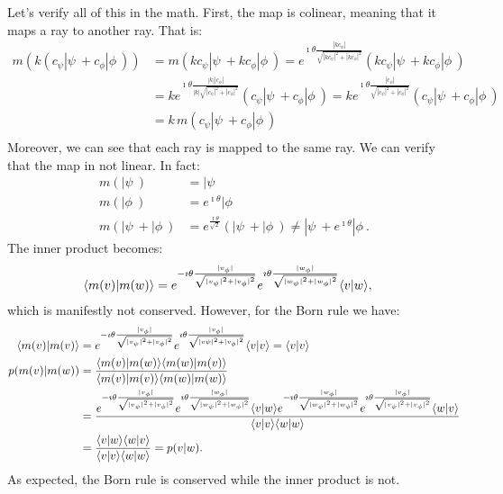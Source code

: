 Let's verify all of this in the math. First, the map is colinear, meaning that it maps a ray to another ray. That is:
\begin{equation}
	\begin{aligned}
	m(k(c_{\psi} | \psi \> + c_{\phi} | \phi \>)) &= m(kc_{\psi} | \psi \> + k c_{\phi} | \phi \>) = e^{\imath \theta \frac{|kc_{\phi}|}{\sqrt{|kc_{\psi}|^2+|kc_{\phi}|^2}}} ( k c_{\psi} | \psi \> + k c_{\phi}  | \phi \>) \\
	&= k e^{\imath \theta \frac{|k||c_{\phi}|}{|k|\sqrt{|c_{\psi}|^2+|c_{\phi}|^2}}} ( c_{\psi} | \psi \> + c_{\phi}  | \phi \>) = k e^{\imath \theta \frac{|c_{\phi}|}{\sqrt{|c_{\psi}|^2+|c_{\phi}|^2}}} \left( c_{\psi} | \psi \> + c_{\phi}  | \phi \> \right) \\
	&= k \, m(c_{\psi} | \psi \> + c_{\phi} | \phi \>) \\
	\end{aligned}
\end{equation}
Moreover, we can see that each ray is mapped to the same ray. We can verify that the map in not linear. In fact:
\begin{equation}
	\begin{aligned}
		m(|\psi\>) &= |\psi\> \\
		m(|\phi\>) &=  e^{\imath \theta} | \phi \>\\
		m(|\psi\> + |\phi\>) &= e^{\frac{\imath \theta}{\sqrt{2}}}( |\psi\> +  | \phi \>) \neq |\psi\> + e^{\imath \theta} | \phi \>.
	\end{aligned}
\end{equation}
The inner product becomes:
\begin{equation}
	\begin{aligned}
	\langle m(v) | m(w) \rangle &= e^{-\imath \theta \frac{|v_{\phi}|}{\sqrt{|v_{\psi}|^2+|v_{\phi}|^2}}} e^{\imath \theta \frac{|w_{\phi}|}{\sqrt{|w_{\psi}|^2+|w_{\phi}|^2}}} \langle v | w \rangle,
	\end{aligned}
\end{equation}
which is manifestly not conserved. However, for the Born rule we have:
\begin{equation}
	\begin{aligned}
		\langle m(v) | m(v) \rangle &= e^{-\imath \theta \frac{|v_{\phi}|}{\sqrt{|v_{\psi}|^2+|v_{\phi}|^2}}} e^{\imath \theta \frac{|v_{\phi}|}{\sqrt{|v{\psi}|^2+|v_{\phi}|^2}}} \langle v | v \rangle = \langle v | v \rangle \\
	p(m(v)|m(w)) &= \frac{\langle m(v) | m(w) \rangle\langle m(w) | m(v) \rangle}{\langle m(v) | m(v) \rangle\langle m(w) | m(w) \rangle} \\
	&= \frac{e^{-\imath \theta \frac{|v_{\phi}|}{\sqrt{|v_{\psi}|^2+|v_{\phi}|^2}}} e^{\imath \theta \frac{|w_{\phi}|}{\sqrt{|w_{\psi}|^2+|w_{\phi}|^2}}} \langle v | w \rangle e^{-\imath \theta \frac{|w_{\phi}|}{\sqrt{|w_{\psi}|^2+|w_{\phi}|^2}}}e^{\imath \theta \frac{|v_{\phi}|}{\sqrt{|v_{\psi}|^2+|v_{\phi}|^2}}}  \langle w | v \rangle}{\langle v | v \rangle\langle w | w \rangle} \\
		&= \frac{\langle v | w \rangle\langle w | v \rangle}{\langle v | v \rangle\langle w | w \rangle} = p(v|w).
	\end{aligned}
\end{equation}
As expected, the Born rule is conserved while the inner product is not.


